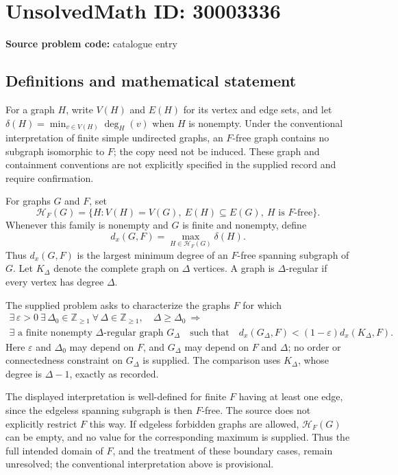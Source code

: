 \documentclass[11pt]{article}
\newcommand{\Z}{\mathbb{Z}}
\begin{document}
\section*{UnsolvedMath ID: 30003336}
\textbf{Source problem code:} catalogue entry
\subsection{Definitions and mathematical statement}
For a graph \(H\), write \(V(H)\) and \(E(H)\) for its vertex and edge sets, and let \(\delta(H)=\min_{v\in V(H)}\deg_H(v)\) when \(H\) is nonempty. Under the conventional interpretation of finite simple undirected graphs, an \(F\)-free graph contains no subgraph isomorphic to \(F\); the copy need not be induced. These graph and containment conventions are not explicitly specified in the supplied record and require confirmation.

For graphs \(G\) and \(F\), set
\[
\mathcal H_F(G)=\{H:V(H)=V(G),\ E(H)\subseteq E(G),\ H\text{ is }F\text{-free}\}.
\]
Whenever this family is nonempty and \(G\) is finite and nonempty, define
\[
d_x(G,F)=\max_{H\in\mathcal H_F(G)}\delta(H).
\]
Thus \(d_x(G,F)\) is the largest minimum degree of an \(F\)-free spanning subgraph of \(G\). Let \(K_\Delta\) denote the complete graph on \(\Delta\) vertices. A graph is \(\Delta\)-regular if every vertex has degree \(\Delta\).

The supplied problem asks to characterize the graphs \(F\) for which
\[
\begin{gathered}
\exists\,\varepsilon>0\ \exists\,\Delta_0\in\Z_{\ge1}\ \forall\,\Delta\in\Z_{\ge1},\quad
\Delta\ge\Delta_0\ \Longrightarrow\\
\exists\text{ a finite nonempty }\Delta\text{-regular graph }G_\Delta
\quad\text{such that}\quad
d_x(G_\Delta,F)<(1-\varepsilon)d_x(K_\Delta,F).
\end{gathered}
\]
Here \(\varepsilon\) and \(\Delta_0\) may depend on \(F\), and \(G_\Delta\) may depend on \(F\) and \(\Delta\); no order or connectedness constraint on \(G_\Delta\) is supplied. The comparison uses \(K_\Delta\), whose degree is \(\Delta-1\), exactly as recorded.

The displayed interpretation is well-defined for finite \(F\) having at least one edge, since the edgeless spanning subgraph is then \(F\)-free. The source does not explicitly restrict \(F\) this way. If edgeless forbidden graphs are allowed, \(\mathcal H_F(G)\) can be empty, and no value for the corresponding maximum is supplied. Thus the full intended domain of \(F\), and the treatment of these boundary cases, remain unresolved; the conventional interpretation above is provisional.
\end{document}
